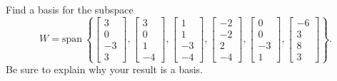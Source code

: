 \documentclass{article}
\begin{document}
\begin{exerciseStatement}
    Find a basis for the subspace
\[W=\mathrm{span}\ \left\{\left[\begin{array}{r}
3 \\
0 \\
-3 \\
3
\end{array}\right] , \left[\begin{array}{r}
3 \\
0 \\
1 \\
-4
\end{array}\right] , \left[\begin{array}{r}
1 \\
1 \\
-3 \\
-4
\end{array}\right] , \left[\begin{array}{r}
-2 \\
-2 \\
2 \\
-4
\end{array}\right] , \left[\begin{array}{r}
0 \\
0 \\
-3 \\
1
\end{array}\right] , \left[\begin{array}{r}
-6 \\
3 \\
8 \\
3
\end{array}\right]\right\}.\]
 Be sure to explain why your result is a basis.


  
\end{exerciseStatement}
\end{document}
